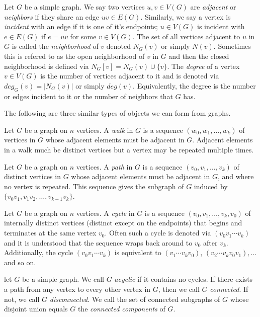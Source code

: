 Let $G$ be a simple graph. We say two vertices $u,v\in V(G)$ are \textit{adjacent} or \textit{neighbors} if they share an edge $uv\in E(G)$. Similarly, we say a vertex is \textit{incident} with an edge if it is one of it's endpoints; $u\in V(G)$ is incident with $e\in E(G)$ if $e=uv$ for some $v\in V(G)$. The set of all vertices adjacent to $u$ in $G$  is called the \textit{neighborhood} of $v$ denoted $N_{G}(v)$ or simply $N(v)$. Sometimes this is refered to as the open neighborhood of $v$ in $G$ and then the closed neighborhood is defined via $N_{G}[v]=N_{G}(v)\cup \{v\}$. The \textit{degree} of a vertex $v\in V(G)$ is the number of vertices adjacent to it and is denoted via $deg_{G}(v)=|N_{G}(v)|$ or simply $deg(v)$. Equivalently, the degree is the number or edges incident to it or the number of neighbors that $G$ has.

The following are three similar types of objects we can form from graphs.

\begin{definition}[Walk]
Let $G$ be a graph on $n$ vertices. A \textit{walk} in $G$ is a sequence $(w_{0},w_{1},\hdots,w_{k})$ of vertices in $G$ whose adjacent elements must be adjacent in $G$. Adjacent elements in a walk much be distinct vertices but a vertex may be repeated multiple times.
\end{definition}

\begin{definition}[Path]
Let $G$ be a graph on $n$ vertices. A \textit{path} in $G$ is a sequence $(v_{0},v_{1},\hdots,v_{k})$ of distinct vertices in $G$ whose adjacent elements must be adjacent in $G$, and where no vertex is repeated. This sequence gives the subgraph of $G$ induced by $\{v_{0}v_{1},v_{1}v_{2},\hdots,v_{k-1}v_{k}\}$.
\end{definition}

\begin{definition}[Cycle]
Let $G$ be a graph on $n$ vertices. A \textit{cycle} in $G$ is a sequence $(v_{0},v_{1},\hdots,v_{k},v_{0})$ of internally distinct vertices (distinct except on the endpoints) that begins and terminates at the same vertex $v_{0}$. Often such a cycle is denoted via $(v_{0}v_{1}\cdots v_{k})$ and it is understood that the sequence wraps back around to $v_{0}$ after $v_{k}$. Additionally, the cycle $(v_{0}v_{1}\cdots v_{k})$ is equivalent to $(v_{1}\cdots v_{k}v_{0})$, $(v_{2}\cdots v_{k}v_{0}v_{1}),\hdots$ and so on. 
\end{definition}

let $G$ be a simple graph. We call $G$ \textit{acyclic} if it contains no cycles. If there exists a path from any vertex to every other vertex in $G$, then we call $G$ \textit{connected}. If not, we call $G$ \textit{disconnected}. We call the set of connected subgraphs of $G$ whose disjoint union equals $G$ the \textit{connected components} of $G$.


